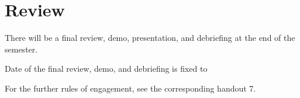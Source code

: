 
\section*{Review}
\label{sec:review}

There will be a final review, demo, presentation, and debriefing at the end
of the semester.


Date of the final review, demo, and debriefing is fixed to
\begin{center}
\end{center}

For the further rules of engagement, see the corresponding handout 7.














